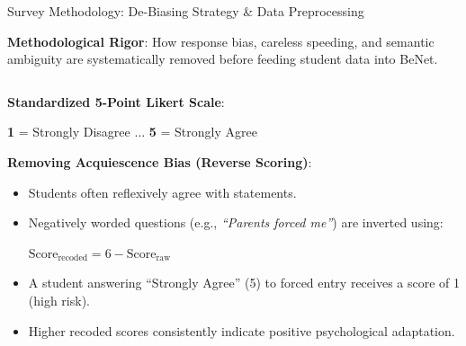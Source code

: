 \documentclass{beamer}
\begin{document}
\begin{frame}[t]{Survey Methodology: De-Biasing Strategy \& Data Preprocessing}
  \vspace{-0.20cm}
  \begin{topsummarybar}
    \fontsize{5.8pt}{7.0pt}\selectfont
    \textbf{\color{NavyDark}Methodological Rigor}: How response bias, careless speeding, and semantic ambiguity are systematically removed before feeding student data into BeNet.
  \end{topsummarybar}
  \vspace{-0.25cm}

  \begin{columns}[T]
    \begin{column}{0.49\textwidth}
      \begin{tcolorbox}[colback=white, colframe=BlueDeep, arc=1.2mm, boxrule=0.7pt, top=0.5mm, bottom=0.5mm, left=1mm, right=1mm, title={\scriptsize\bfseries\color{white}1. Rating Scale \& Acquiescence De-Biasing}, colbacktitle=BlueDeep]
        \fontsize{4.4pt}{5.4pt}\selectfont
        \textbf{Standardized 5-Point Likert Scale}:
        \begin{center}\vspace{-2pt}
          \scriptsize \textbf{1} = Strongly Disagree \quad $\dots$ \quad \textbf{5} = Strongly Agree\vspace{-2pt}
        \end{center}
        \textbf{Removing Acquiescence Bias (Reverse Scoring)}:
        \begin{itemize}\setlength{\itemsep}{1pt}\setlength{\parskip}{0pt}
          \item Students often reflexively agree with statements.
          \item Negatively worded questions (e.g., \emph{``Parents forced me''}) are inverted using:
            \begin{center}\vspace{-2pt}
              $\text{Score}_{\text{recoded}} = 6 - \text{Score}_{\text{raw}}$\vspace{-2pt}
            \end{center}
          \item A student answering ``Strongly Agree'' (5) to forced entry receives a score of 1 (high risk).
          \item Higher recoded scores consistently indicate positive psychological adaptation.

\end{itemize}
\end{tcolorbox}
\end{column}
\end{columns}
\end{frame}
\end{document}
